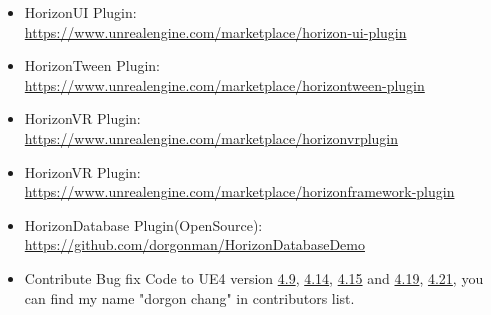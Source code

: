 \documentclass[a4paper,12pt]{memoir} %
\begin{document}

\newpage


\userinformation %

\framebreak %




{
  \begin{itemize}

    \item HorizonUI Plugin: \\
        \href{https://www.unrealengine.com/marketplace/horizon-ui-plugin}
             {https://www.unrealengine.com/marketplace/horizon-ui-plugin} \\
    \item HorizonTween Plugin: \\
        \href{https://www.unrealengine.com/marketplace/horizontween-plugin}
             {https://www.unrealengine.com/marketplace/horizontween-plugin} \\
    \item HorizonVR Plugin: \\
          \href{https://www.unrealengine.com/marketplace/horizonvrplugin}
               {https://www.unrealengine.com/marketplace/horizonvrplugin} \\
    \item HorizonVR Plugin: \\
          \href{https://www.unrealengine.com/marketplace/horizonframework-plugin}
               {https://www.unrealengine.com/marketplace/horizonframework-plugin} \\
    \item HorizonDatabase Plugin(OpenSource): \\
          \href{https://github.com/dorgonman/HorizonDatabaseDemo}
              {https://github.com/dorgonman/HorizonDatabaseDemo}  \\
              
    \item Contribute Bug fix Code to UE4 version 
    \href{https://docs.unrealengine.com/latest/INT/Support/Builds/ReleaseNotes/2015/4_9/index.html}{4.9}, 
    \href{https://docs.unrealengine.com/latest/INT/Support/Builds/ReleaseNotes/2016/4_14/index.html}{4.14}, 
    \href{https://docs.unrealengine.com/latest/INT/Support/Builds/ReleaseNotes/4_15/}{4.15} and 
    \href{https://docs.unrealengine.com/latest/INT/Support/Builds/ReleaseNotes/4_19/}{4.19}, 
    \href{https://docs.unrealengine.com/latest/INT/Support/Builds/ReleaseNotes/4_21/}{4.21}, you can find my name "dorgon chang" in contributors list. \\


\end{itemize}}
\end{document}
